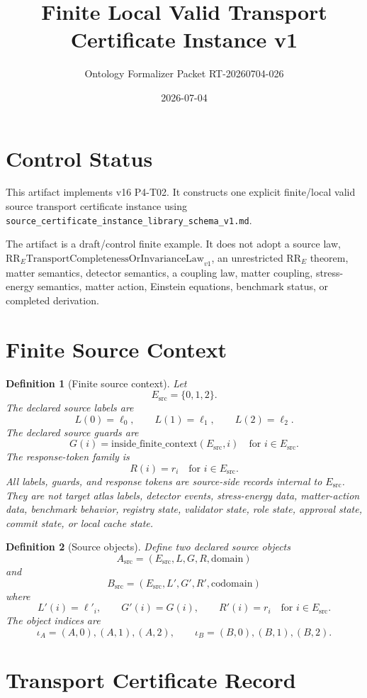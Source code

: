 \documentclass[11pt]{article}
\title{Finite Local Valid Transport Certificate Instance v1}
\author{Ontology Formalizer Packet RT-20260704-026}
\date{2026-07-04}
\newcommand{\Esrc}{E_{\mathrm{src}}}
\newcommand{\Asrc}{A_{\mathrm{src}}}
\newcommand{\Bsrc}{B_{\mathrm{src}}}
\newcommand{\RRE}{\mathrm{RR}_{E}}
\newcommand{\RRELaw}{\mathrm{RR}_{E}\mathrm{TransportCompletenessOrInvarianceLaw}_{v1}}
\newtheorem{definition}{Definition}
\begin{document}
\maketitle

\section{Control Status}

This artifact implements v16 P4-T02. It constructs one explicit finite/local
valid source transport certificate instance using
\texttt{source\_certificate\_instance\_library\_schema\_v1.md}.

The artifact is a draft/control finite example. It does not adopt a source
law, \(\RRELaw\), an unrestricted \(\RRE\) theorem, matter semantics,
detector semantics, a coupling law, matter coupling, stress-energy semantics,
matter action, Einstein equations, benchmark status, or completed derivation.

\section{Finite Source Context}

\begin{definition}[Finite source context]
Let
\[
  \Esrc=\{0,1,2\}.
\]
The declared source labels are
\[
  L(0)=\ell_0,\qquad L(1)=\ell_1,\qquad L(2)=\ell_2.
\]
The declared source guards are
\[
  G(i)=\mathrm{inside\_finite\_context}(\Esrc,i)
  \quad\text{for } i\in\Esrc.
\]
The response-token family is
\[
  R(i)=r_i \quad\text{for } i\in\Esrc.
\]
All labels, guards, and response tokens are source-side records internal to
\(\Esrc\). They are not target atlas labels, detector events,
stress-energy data, matter-action data, benchmark behavior, registry state,
validator state, role state, approval state, commit state, or local cache
state.
\end{definition}

\begin{definition}[Source objects]
Define two declared source objects
\[
  \Asrc=(\Esrc,L,G,R,\mathrm{domain})
\]
and
\[
  \Bsrc=(\Esrc,L',G',R',\mathrm{codomain})
\]
where
\[
  L'(i)=\ell'_i,\qquad G'(i)=G(i),\qquad R'(i)=r_i
  \quad\text{for } i\in\Esrc.
\]
The object indices are
\[
  \iota_A=(A,0),(A,1),(A,2),\qquad
  \iota_B=(B,0),(B,1),(B,2).
\]
\end{definition}

\section{Transport Certificate Record}
\end{document}
